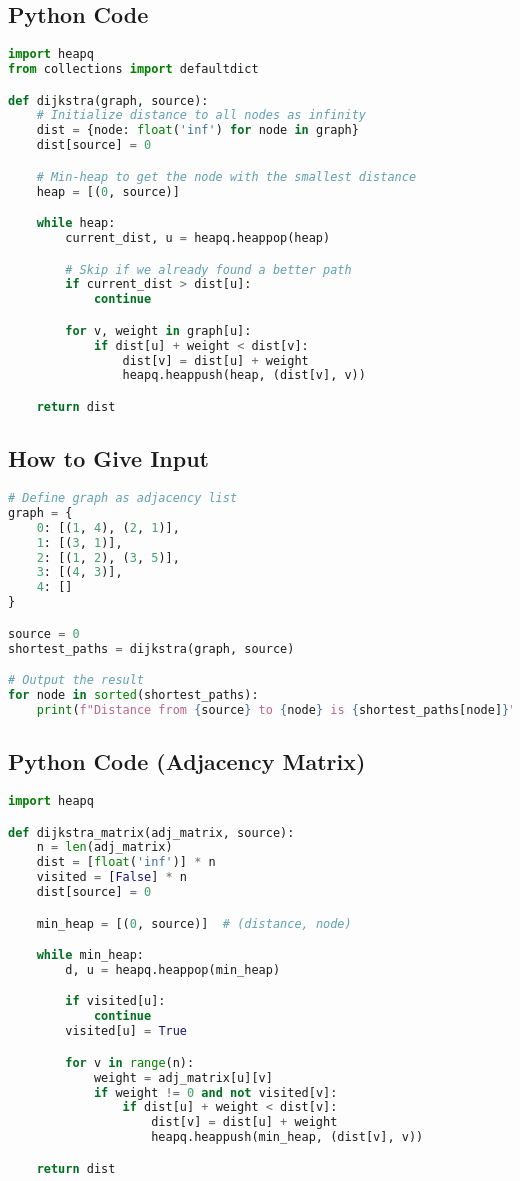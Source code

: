 \documentclass[14pt]{extarticle}
\begin{document}
\newpage

\subsection*{Python Code}
\begin{lstlisting}[language=Python]
import heapq
from collections import defaultdict

def dijkstra(graph, source):
    # Initialize distance to all nodes as infinity
    dist = {node: float('inf') for node in graph}
    dist[source] = 0

    # Min-heap to get the node with the smallest distance
    heap = [(0, source)]

    while heap:
        current_dist, u = heapq.heappop(heap)

        # Skip if we already found a better path
        if current_dist > dist[u]:
            continue

        for v, weight in graph[u]:
            if dist[u] + weight < dist[v]:
                dist[v] = dist[u] + weight
                heapq.heappush(heap, (dist[v], v))

    return dist
\end{lstlisting}

\subsection*{How to Give Input}

\begin{lstlisting}[language=Python]
# Define graph as adjacency list
graph = {
    0: [(1, 4), (2, 1)],
    1: [(3, 1)],
    2: [(1, 2), (3, 5)],
    3: [(4, 3)],
    4: []
}

source = 0
shortest_paths = dijkstra(graph, source)

# Output the result
for node in sorted(shortest_paths):
    print(f"Distance from {source} to {node} is {shortest_paths[node]}")
\end{lstlisting}

\subsection*{Python Code (Adjacency Matrix)}
\begin{lstlisting}[language=Python]
import heapq

def dijkstra_matrix(adj_matrix, source):
    n = len(adj_matrix)
    dist = [float('inf')] * n
    visited = [False] * n
    dist[source] = 0

    min_heap = [(0, source)]  # (distance, node)

    while min_heap:
        d, u = heapq.heappop(min_heap)

        if visited[u]:
            continue
        visited[u] = True

        for v in range(n):
            weight = adj_matrix[u][v]
            if weight != 0 and not visited[v]:
                if dist[u] + weight < dist[v]:
                    dist[v] = dist[u] + weight
                    heapq.heappush(min_heap, (dist[v], v))

    return dist
\end{lstlisting}
\end{document}
